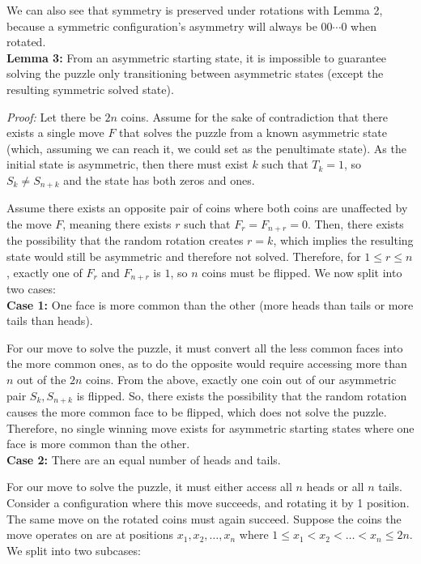 \documentclass{article}
\begin{document}
	We can also see that symmetry is preserved under rotations with Lemma 2, because a symmetric configuration's asymmetry will always be $00\cdots 0$ when rotated.\\
	
	\textbf{Lemma 3:} From an asymmetric starting state, it is impossible to guarantee solving the puzzle only transitioning between asymmetric states (except the resulting symmetric solved state).
	
	\textit{Proof:} Let there be $2n$ coins. Assume for the sake of contradiction that there exists a single move $F$ that solves the puzzle from a known asymmetric state (which, assuming we can reach it, we could set as the penultimate state). As the initial state is asymmetric, then there must exist $k$ such that $T_k = 1$, so $S_k\neq S_{n + k}$ and the state has both zeros and ones. 
    
    Assume there exists an opposite pair of coins where both coins are unaffected by the move $F$, meaning there exists $r$ such that $F_r = F_{n + r} = 0$. Then, there exists the possibility that the random rotation creates $r = k$, which implies the resulting state would still be asymmetric and therefore not solved. Therefore, for $1\leq r\leq n$, exactly one of $F_r$ and $F_{n + r}$ is $1$, so $n$ coins must be flipped. We now split into two cases: \\

    \textbf{Case 1:} One face is more common than the other (more heads than tails or more tails than heads).
    
    For our move to solve the puzzle, it must convert all the less common faces into the more common ones, as to do the opposite would require accessing more than $n$ out of the $2n$ coins. From the above, exactly one coin out of our asymmetric pair $S_k, S_{n + k}$ is flipped. So, there exists the possibility that the random rotation causes the more common face to be flipped, which does not solve the puzzle. Therefore, no single winning move exists for asymmetric starting states where one face is more common than the other. \\

    \textbf{Case 2:} There are an equal number of heads and tails.

    For our move to solve the puzzle, it must either access all $n$ heads or all $n$ tails. Consider a configuration where this move succeeds, and rotating it by 1 position. The same move on the rotated coins must again succeed. Suppose the coins the move operates on are at positions $x_1, x_2, \dots, x_n$ where $1\leq x_1 < x_2 < \dots < x_n \leq 2n$. We split into two subcases:\\
    
\end{document}
